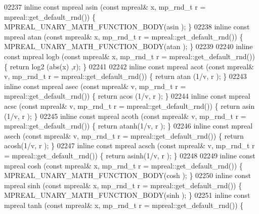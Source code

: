 \begin{DoxyCode}
{{02237 \textcolor{keyword}{inline} \textcolor{keyword}{const} mpreal asin  (\textcolor{keyword}{const} mpreal& x, mp\_rnd\_t r = mpreal::get\_default\_rnd()) \{   
      MPREAL\_UNARY\_MATH\_FUNCTION\_BODY(asin );    \}
02238 \textcolor{keyword}{inline} \textcolor{keyword}{const} mpreal atan  (\textcolor{keyword}{const} mpreal& x, mp\_rnd\_t r = mpreal::get\_default\_rnd()) \{   
      MPREAL\_UNARY\_MATH\_FUNCTION\_BODY(atan );    \}
02239 
02240 \textcolor{keyword}{inline} \textcolor{keyword}{const} mpreal logb  (\textcolor{keyword}{const} mpreal& x, mp\_rnd\_t r = mpreal::get\_default\_rnd()) \{   \textcolor{keywordflow}{return} log2 (abs(x)
      ,r);                    \}
02241 
02242 \textcolor{keyword}{inline} \textcolor{keyword}{const} mpreal acot  (\textcolor{keyword}{const} mpreal& v, mp\_rnd\_t r = mpreal::get\_default\_rnd()) \{   \textcolor{keywordflow}{return} atan (1/v, r
      );                      \}
02243 \textcolor{keyword}{inline} \textcolor{keyword}{const} mpreal asec  (\textcolor{keyword}{const} mpreal& v, mp\_rnd\_t r = mpreal::get\_default\_rnd()) \{   \textcolor{keywordflow}{return} acos (1/v, r
      );                      \}
02244 \textcolor{keyword}{inline} \textcolor{keyword}{const} mpreal acsc  (\textcolor{keyword}{const} mpreal& v, mp\_rnd\_t r = mpreal::get\_default\_rnd()) \{   \textcolor{keywordflow}{return} asin (1/v, r
      );                      \}
02245 \textcolor{keyword}{inline} \textcolor{keyword}{const} mpreal acoth (\textcolor{keyword}{const} mpreal& v, mp\_rnd\_t r = mpreal::get\_default\_rnd()) \{   \textcolor{keywordflow}{return} atanh(1/v, r
      );                      \}
02246 \textcolor{keyword}{inline} \textcolor{keyword}{const} mpreal asech (\textcolor{keyword}{const} mpreal& v, mp\_rnd\_t r = mpreal::get\_default\_rnd()) \{   \textcolor{keywordflow}{return} acosh(1/v, r
      );                      \}
02247 \textcolor{keyword}{inline} \textcolor{keyword}{const} mpreal acsch (\textcolor{keyword}{const} mpreal& v, mp\_rnd\_t r = mpreal::get\_default\_rnd()) \{   \textcolor{keywordflow}{return} asinh(1/v, r
      );                      \}
02248 
02249 \textcolor{keyword}{inline} \textcolor{keyword}{const} mpreal cosh  (\textcolor{keyword}{const} mpreal& x, mp\_rnd\_t r = mpreal::get\_default\_rnd()) \{   
      MPREAL\_UNARY\_MATH\_FUNCTION\_BODY(cosh );    \}
02250 \textcolor{keyword}{inline} \textcolor{keyword}{const} mpreal sinh  (\textcolor{keyword}{const} mpreal& x, mp\_rnd\_t r = mpreal::get\_default\_rnd()) \{   
      MPREAL\_UNARY\_MATH\_FUNCTION\_BODY(sinh );    \}
02251 \textcolor{keyword}{inline} \textcolor{keyword}{const} mpreal tanh  (\textcolor{keyword}{const} mpreal& x, mp\_rnd\_t r = mpreal::get\_default\_rnd()) \{   
}}
\end{DoxyCode}
